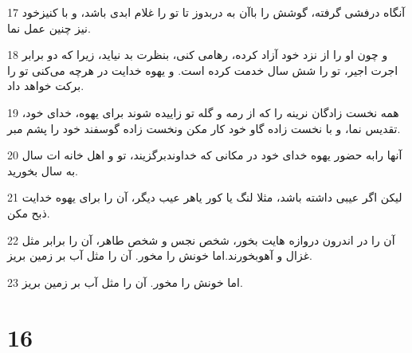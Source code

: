 \par 17 آنگاه درفشی گرفته، گوشش را باآن به دربدوز تا تو را غلام ابدی باشد، و با کنیزخود نیز چنین عمل نما.
\par 18 و چون او را از نزد خود آزاد کرده، رهامی کنی، بنظرت بد نیاید، زیرا که دو برابر اجرت اجیر، تو را شش سال خدمت کرده است. و یهوه خدایت در هرچه می‌کنی تو را برکت خواهد داد.
\par 19 همه نخست زادگان نرینه را که از رمه و گله تو زاییده شوند برای یهوه، خدای خود، تقدیس نما، و با نخست زاده گاو خود کار مکن ونخست زاده گوسفند خود را پشم مبر.
\par 20 آنها رابه حضور یهوه خدای خود در مکانی که خداوندبرگزیند، تو و اهل خانه ات سال به سال بخورید.
\par 21 لیکن اگر عیبی داشته باشد، مثلا لنگ یا کور یاهر عیب دیگر، آن را برای یهوه خدایت ذبح مکن.
\par 22 آن را در اندرون دروازه هایت بخور، شخص نجس و شخص طاهر، آن را برابر مثل غزال و آهوبخورند.اما خونش را مخور. آن را مثل آب بر زمین بریز.
\par 23 اما خونش را مخور. آن را مثل آب بر زمین بریز.
 
\chapter{16}


